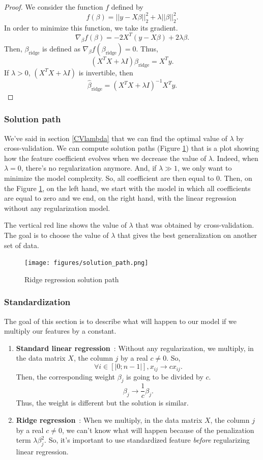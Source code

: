 \documentclass[a4paper,12pt]{article}
\begin{document}
\begin{proof}
We consider the function $f$ defined by
\[ f(\beta) = ||y - X\beta||_2^2 + \lambda ||\beta||_2^2.\]
In order to minimize this function, we take its gradient.
\[ \nabla_{\beta}f(\beta) = -2X^T (y-X\beta) + 2\lambda \beta.\]
Then, $\beta_\text{ridge}$ is defined as $\nabla_{\beta}f(\beta_{\text{ridge}}) = 0$. Thus,
\[ (X^TX+\lambda I)\beta_\text{ridge} = X^T y.\]
If $\lambda > 0$, $(X^T X + \lambda I)$ is invertible, then
\[ \hat{\beta}_\text{ridge} = (X^T X+ \lambda I)^{-1} X^T y. \]
\end{proof}

\subsubsection{Solution path}
We've said in section \ref{CVlambda} that we can find the optimal value of $\lambda$ by cross-validation. We can compute solution paths (Figure \ref{SolutionPath}) that is a plot showing how the feature coefficient evolves when we decrease the value of $\lambda$. Indeed, when $\lambda = 0$, there's no regularization anymore. And, if $\lambda \gg 1$, we only want to minimize the model complexity. So, all coefficient are then equal to $0$. Then, on the Figure \ref{SolutionPath}, on the left hand, we start with the model in which all coefficients are equal to zero and we end, on the right hand, with the linear regression without any regularization model.

The vertical red line shows the value of $\lambda$ that was obtained by cross-validation. The goal is to choose the value of $\lambda$ that gives the best generalization on another set of data.
\begin{figure}[!h]
\centerline{
\texttt{[image: figures/solution\_path.png]}}
\caption{Ridge regression solution path}
\label{SolutionPath}
\end{figure}

\subsubsection{Standardization}
The goal of this section is to describe what will happen to our model if we multiply our features by a constant.
\begin{enumerate}
\item \textbf{Standard linear regression}~: Without any regularization, we multiply, in the data matrix $X$, the column $j$ by a real $c \not = 0$. So, 
\[\forall i \in [|0;n-1|], x_{ij} \to c x_{ij}.\]
Then, the corresponding weight $\beta_j$ is going to be divided by $c$.
\[ \beta_j \to \frac{1}{c} \beta_j.\]
Thus, the weight is different but the solution is similar.
\item \textbf{Ridge regression}~: When we multiply, in the data matrix $X$, the column $j$ by a real $c \not = 0$, we can't know what will happen because of the penalization term $\lambda \beta_j^2$. So, it's important to use standardized feature \emph{before} regularizing linear regression.
\end{enumerate}
\end{document}
